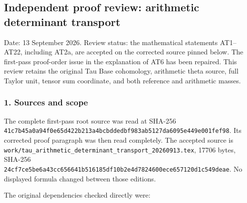 \subsection{Independent proof review: arithmetic determinant transport}\label{endpoint-determinant_review--independent-proof-review-arithmetic-determinant-transport}

Date: 13 September 2026. Review status: the mathematical statements AT1--AT22, including AT2a, are accepted on the corrected source pinned below. The first-pass proof-order issue in the explanation of AT6 has been repaired. This review retains the original Tau Base cohomology, arithmetic theta source, full Taylor unit, tensor sum coordinate, and both reference and arithmetic masses.

\subsubsection{1. Sources and scope}\label{endpoint-determinant_review--sources-and-scope}

The complete first-pass root source was read at SHA-256 \nolinkurl{41c7b45a0a94f0e65d422b213a4bcbddedbf983ab5127da6095e449e001fef98}. Its corrected proof paragraph was then read completely. The accepted source is \nolinkurl{work/tau_arithmetic_determinant_transport_20260913.tex}, 17706 bytes, SHA-256 \nolinkurl{24cf7ce5be6a43cc656641b516185df10b2e4d7824600ece657120d1c549deae}. No displayed formula changed between those editions.

The original dependencies checked directly were:

